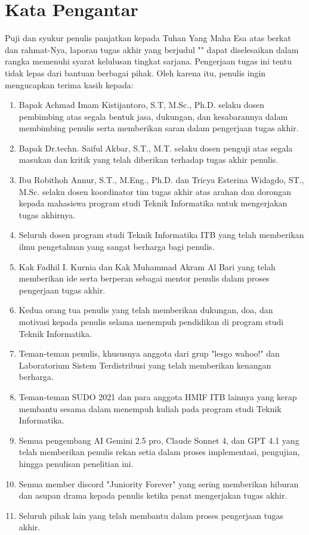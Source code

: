 \chapter*{Kata Pengantar}

Puji dan syukur penulis panjatkan kepada Tuhan Yang Maha Esa atas berkat dan rahmat-Nya, laporan tugas akhir yang berjudul "\thetitle" dapat diselesaikan dalam rangka memenuhi syarat kelulusan tingkat sarjana. Pengerjaan tugas ini tentu tidak lepas dari bantuan berbagai pihak. Oleh karena itu, penulis ingin mengucapkan terima kasih kepada:

\begin{enumerate}
	\item Bapak Achmad Imam Kistijantoro, S.T, M.Sc., Ph.D. selaku dosen pembimbing atas segala bentuk jasa, dukungan, dan kesabarannya dalam membimbing penulis serta memberikan saran dalam pengerjaan tugas akhir.
	\item Bapak Dr.techn. Saiful Akbar, S.T., M.T. selaku dosen penguji atas segala masukan dan kritik yang telah diberikan terhadap tugas akhir penulis.
	\item Ibu Robithoh Annur, S.T., M.Eng., Ph.D. dan Tricya Esterina Widagdo, ST., M.Sc. selaku dosen koordinator tim tugas akhir atas arahan dan dorongan kepada mahasiswa program studi Teknik Informatika untuk mengerjakan tugas akhirnya.
	\item Seluruh dosen program studi Teknik Informatika ITB yang telah memberikan ilmu pengetahuan yang sangat berharga bagi penulis.
	\item Kak Fadhil I. Kurnia dan Kak Muhammad Akram Al Bari yang telah memberikan ide serta berperan sebagai mentor penulis dalam proses pengerjaan tugas akhir.
	\item Kedua orang tua penulis yang telah memberikan dukungan, doa, dan motivasi kepada penulis selama menempuh pendidikan di program studi Teknik Informatika.
	\item Teman-teman penulis, khususnya anggota dari grup "lesgo wahoo!" dan Laboratorium Sistem Terdistribusi yang telah memberikan kenangan berharga.
	\item Teman-teman SUDO 2021 dan para anggota HMIF ITB lainnya yang kerap membantu sesama dalam menempuh kuliah pada program studi Teknik Informatika.
	\item Semua pengembang AI Gemini 2.5 pro, Claude Sonnet 4, dan GPT 4.1 yang telah memberikan penulis rekan setia dalam proses implementasi, pengujian, hingga penulisan penelitian ini.
	\item Semua member discord "Juniority Forever" yang sering memberikan hiburan dan asupan drama kepada penulis ketika penat mengerjakan tugas akhir.
	\item Seluruh pihak lain yang telah membantu dalam proses pengerjaan tugas akhir.
\end{enumerate}

